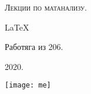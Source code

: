 \documentclass[a4paper,12pt]{article}
\numberwithin{equation}{subsection}
\begin{document}
  
\begin{titlepage}
\newpage
\begin{center}
\Large{\textsc{Лекции по матанализу.}}

\LaTeX
\end{center}
\vspace{2cm}
\begin{center}
Работяга из 206.
\end{center}

\vspace{\fill}
\begin{center}
2020.
\end{center}
\end{titlepage}
\texttt{[image: me]}
\newpage

\tableofcontents
\newpage



\end{document}
